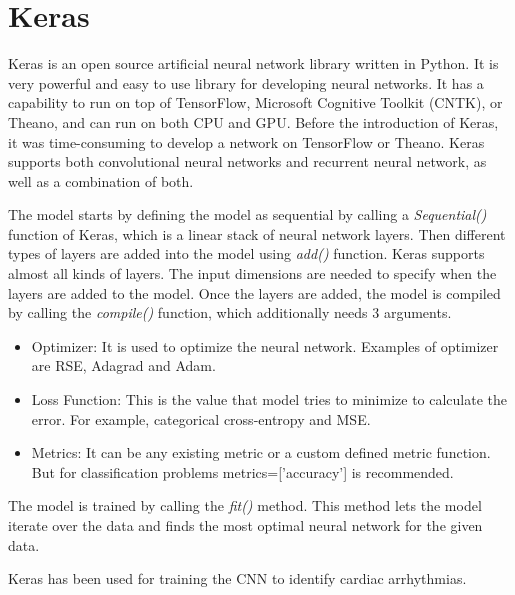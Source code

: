 \section{Keras}

Keras is an open source artificial neural network library written in Python. It is very powerful and easy to use library for developing neural networks. It has a capability to run on top of TensorFlow, Microsoft Cognitive Toolkit (CNTK), or Theano, and can run on both CPU and GPU. Before the introduction of Keras, it was time-consuming to develop a network on TensorFlow or Theano. Keras supports both convolutional neural networks and recurrent neural network, as well as a combination of both.

The model starts by defining the model as sequential by calling a \textit{Sequential()} function of Keras, which is a linear stack of neural network layers. Then different types of layers are added into the model using \textit{add()} function. Keras supports almost all kinds of layers. The input dimensions are needed to specify when the layers are added to the model. Once the layers are added, the model is compiled by calling the \textit{compile()} function, which additionally needs 3 arguments.

\begin{itemize}
	\item Optimizer: It is used to optimize the neural network. Examples of optimizer are RSE, Adagrad and Adam.
	\item Loss Function: This is the value that model tries to minimize to calculate the error. For example, categorical cross-entropy and MSE.
	\item Metrics: It can be any existing metric or a custom defined metric function. But for classification problems metrics=['accuracy'] is recommended.
\end{itemize}

The model is trained by calling the \textit{fit()} method. This method lets the model iterate over the data and finds the most optimal neural network for the given data.

Keras has been used for training the CNN to identify cardiac arrhythmias.


